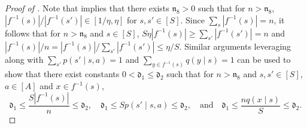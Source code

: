 \documentclass[11pt]{article}
\newcommand{\mf}[1]{\mathfrak{#1}}
\theoremstyle{definition}
\theoremstyle{definition}
\begin{document}
\begin{proof}
	[Proof of ]

	Note that  implies that there exists $\mf{n}_8>0$ such that for $n>\mf{n}_8$, $|f^{-1}(s)|/\allowbreak |f^{-1}(s')|\in[1/\eta,\eta]$ for $s,s'\in[S]$.
	Since $\sum_{s}|f^{-1}(s)|=n$, it follows that for $n>\mf{n}_8$ and $s\in[S]$, $S\eta |f^{-1}(s)| \geq \sum_{s'}|f^{-1}(s')|=n$ and $|f^{-1}(s)|/n = |f^{-1}(s)|/\sum_{s'}|f^{-1}(s')|\leq \eta/S$.
	Similar arguments leveraging  along with $\sum_{s'}p(s'\mid s,a)=1$ and $\sum_{y\in f^{-1}(s)}q(y\mid s)=1$ can be used to show that there exist constants $0<\mf{d}_1\leq \mf{d}_2$ such that for $n> \mf{n}_8$ and $s,s'\in[S]$, $a\in[A]$ and $x\in f^{-1}(s)$,
	\begin{equation}
		\label{eqn:bounds_implied_by_reachability}
		\mf{d}_1\leq \frac{S|f^{-1}(s)|}{n}\leq\mf{d}_2
		,
		\quad
		\mf{d}_1\leq Sp(s'\mid s,a)\leq\mf{d}_2
		,
		\quad
		\mathrm{and}
		\quad
		\mf{d}_1\leq \frac{nq(x\mid s)}{S}\leq\mf{d}_2
		.
	\end{equation}


\end{proof}
\end{document}
